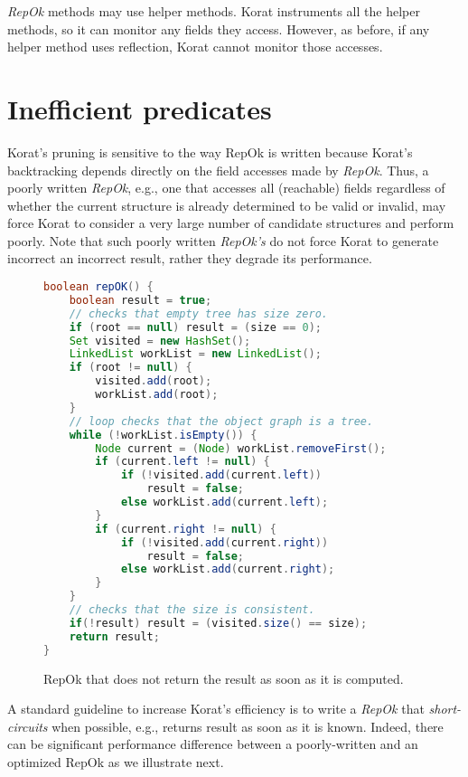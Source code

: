 \emph{RepOk} methods may use helper methods.  Korat instruments all the
helper methods, so it can monitor any fields they access.  However, as
before, if any helper method uses reflection, Korat cannot monitor
those accesses.

\section{Inefficient predicates}
\label{sec:inefficient-predicates}

Korat's pruning is sensitive to the way RepOk is written because
Korat's backtracking depends directly on the field accesses made by
\emph{RepOk}.  Thus, a poorly written \emph{RepOk}, e.g., one that accesses all
(reachable) fields regardless of whether the current structure is
already determined to be valid or invalid, may force Korat to consider
a very large number of candidate structures and perform poorly.  Note
that such poorly written \emph{RepOk's} do not force Korat to generate
incorrect an incorrect result, rather they degrade its performance.

\begin{figure}
\centering
\begin{lstlisting}[language=Java]
boolean repOK() {
    boolean result = true;
    // checks that empty tree has size zero.
    if (root == null) result = (size == 0);
    Set visited = new HashSet();
    LinkedList workList = new LinkedList();
    if (root != null) {
        visited.add(root);
        workList.add(root);
    }
    // loop checks that the object graph is a tree.
    while (!workList.isEmpty()) {
        Node current = (Node) workList.removeFirst();
        if (current.left != null) {
            if (!visited.add(current.left))
                result = false;
            else workList.add(current.left);
        }
        if (current.right != null) {
            if (!visited.add(current.right)) 
                result = false;
            else workList.add(current.right);
        }
    }
    // checks that the size is consistent.
    if(!result) result = (visited.size() == size);
    return result;
}
\end{lstlisting}
\caption{RepOk that does not return the result as soon as it is computed.}
\label{fig:bTreeInefficient}
\end{figure}

A standard guideline to increase Korat's efficiency is to write a
\emph{RepOk} that \emph{short-circuits} when possible, e.g., returns result
as soon as it is known.  Indeed, there can be significant
performance difference between a poorly-written and an optimized RepOk
as we illustrate next.

